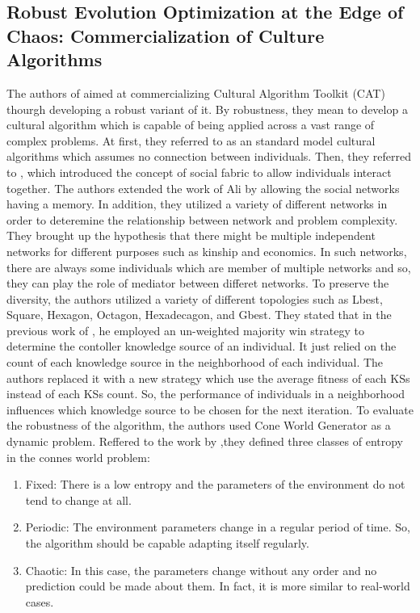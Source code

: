\subsection{Robust Evolution Optimization at the Edge of Chaos: Commercialization of Culture Algorithms}
The authors of \cite{che2010robust} aimed at commercializing Cultural Algorithm Toolkit (CAT) thourgh developing a robust variant of it. By robustness, they mean to develop a cultural algorithm which is capable of being applied across a vast range of complex problems. At first, they referred to \cite{peng2005knowledge} as an standard model cultural algorithms which assumes no connection between individuals. Then, they referred to \cite{ali2008using}, which introduced the concept of social fabric to allow individuals interact together. The authors extended the work of Ali by allowing the social networks having a memory. In addition, they utilized a variety of different networks in order to deteremine the relationship between network and problem complexity. \newline They brought up the hypothesis that there might be multiple independent networks for different purposes such as kinship and economics. In such networks, there are always some individuals which are member of multiple networks and so, they can play the role of mediator between differet networks. To preserve the diversity, the authors utilized a variety of different topologies such as Lbest, Square, Hexagon, Octagon, Hexadecagon, and Gbest. \newline
They stated that in the previous work of \cite{ali2008using}, he employed an un-weighted majority win strategy to determine the contoller knowledge source of an individual. It just relied on the count of each knowledge source in the neighborhood of each individual. The authors replaced it with a new strategy which use the average fitness of each KSs instead of each KSs count. So, the performance of individuals in a neighborhood influences which knowledge source to be chosen for the next iteration. \newline
To evaluate the robustness of the algorithm, the authors used Cone World Generator \cite{morrison1999test} as a dynamic problem. Reffered to the work by \cite{lewin1999complexity} ,they defined three classes of entropy in the connes world problem:
\begin{enumerate}
	\item Fixed: There is a low entropy and the parameters of the environment do not tend to change at all.
	\item Periodic: The environment parameters change in a regular period of time. So, the algorithm should be capable adapting itself regularly.
	\item Chaotic: In this case, the parameters change without any order and no prediction could be made about them. In fact, it is more similar to real-world cases.
\end{enumerate}

